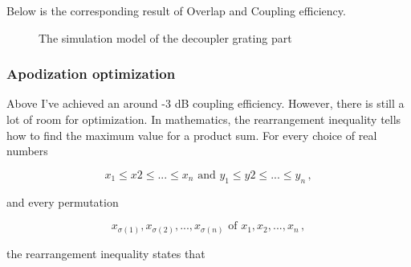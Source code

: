 \documentclass[]{article}
\begin{document}
Below is the corresponding result of Overlap and Coupling efficiency.

\begin{figure}[H]
	\centering
	\caption{The simulation model of the decoupler grating part}
	\label{fig:figure5}
\end{figure}





\subsubsection{Apodization optimization}

Above I've achieved an around -3 dB coupling efficiency. However, there is still a lot of room for optimization. In mathematics, the rearrangement inequality tells how to find the maximum value for a product sum. For every choice of real numbers

$$x_1 \leq x2 \leq ... \leq x_n \text{ and } y_1 \leq y2 \leq ... \leq y_n \, ,$$

and every permutation

$$x_{\sigma (1)}, x_{\sigma (2)},...,x_{\sigma (n)} \text{ of } x_1, x_2, ..., x_n \, ,$$

the rearrangement inequality states that 
\end{document}
